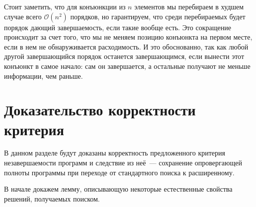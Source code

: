     

    Стоит заметить, что для конъюнкции из $n$ элементов мы перебираем в худшем случае всего $\mathcal{O}(n^2)$ порядков, но гарантируем, что среди перебираемых будет порядок дающий завершаемость, если такие вообще есть. Это сокращение происходит за счет того, что мы не меняем позицию конъюнкта на первом месте, если в нем не обнаруживается расходимость. И это обоснованно, так как любой другой завершающийся порядок останется завершающимся, если вынести этот конъюнкт в самое начало: сам он завершается, а остальные получают не меньше информации, чем раньше.

  \section{Доказательство корректности критерия}
  
    В данном разделе будут доказаны корректность предложенного критерия незавершаемости программ и следствие из неё~--- сохранение опровергающей полноты программы при переходе от стандартного поиска к расширенному.
    
    В начале докажем лемму, описывающую некоторые естественные свойства решений, получаемых поиском.
    
